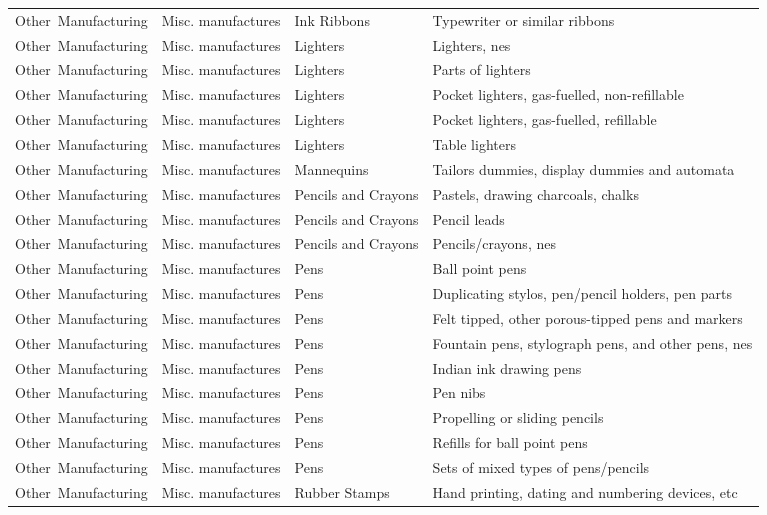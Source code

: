\begin{appendices}
\begin{xltabular}{\textwidth}{|p{0.11\textwidth}|p{0.29\textwidth}|p{0.20\textwidth}|p{0.30\textwidth}|}
			Other\ Manufacturing & Misc. manufactures & Ink Ribbons & Typewriter or similar ribbons \\
			Other\ Manufacturing & Misc. manufactures & Lighters & Lighters, nes \\
			Other\ Manufacturing & Misc. manufactures & Lighters & Parts of lighters \\
			Other\ Manufacturing & Misc. manufactures & Lighters & Pocket lighters, gas-fuelled, non-refillable \\
			Other\ Manufacturing & Misc. manufactures & Lighters & Pocket lighters, gas-fuelled, refillable \\
			Other\ Manufacturing & Misc. manufactures & Lighters & Table lighters \\
			Other\ Manufacturing & Misc. manufactures & Mannequins & Tailors dummies, display dummies and automata \\
			Other\ Manufacturing & Misc. manufactures & Pencils and Crayons & Pastels, drawing charcoals, chalks \\
			Other\ Manufacturing & Misc. manufactures & Pencils and Crayons & Pencil leads \\
			Other\ Manufacturing & Misc. manufactures & Pencils and Crayons & Pencils/crayons, nes \\
			Other\ Manufacturing & Misc. manufactures & Pens & Ball point pens \\
			Other\ Manufacturing & Misc. manufactures & Pens & Duplicating stylos, pen/pencil holders, pen parts \\
			Other\ Manufacturing & Misc. manufactures & Pens & Felt tipped, other porous-tipped pens and markers \\
			Other\ Manufacturing & Misc. manufactures & Pens & Fountain pens, stylograph pens, and other pens, nes \\
			Other\ Manufacturing & Misc. manufactures & Pens & Indian ink drawing pens \\
			Other\ Manufacturing & Misc. manufactures & Pens & Pen nibs \\
			Other\ Manufacturing & Misc. manufactures & Pens & Propelling or sliding pencils \\
			Other\ Manufacturing & Misc. manufactures & Pens & Refills for ball point pens \\
			Other\ Manufacturing & Misc. manufactures & Pens & Sets of mixed types of pens/pencils \\
			Other\ Manufacturing & Misc. manufactures & Rubber Stamps & Hand printing, dating and numbering devices, etc \\

\end{xltabular}
\end{appendices}
